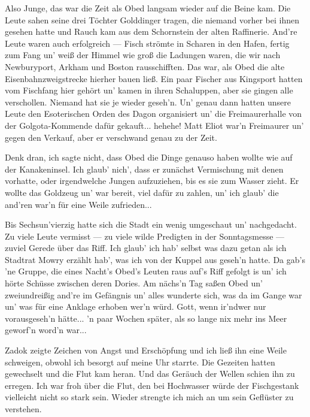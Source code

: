 Also Junge, das war die Zeit als Obed langsam wieder auf die Beine kam. Die Leute sahen seine drei Töchter Golddinger tragen, die niemand vorher bei ihnen gesehen hatte und Rauch kam aus dem Schornstein der alten Raffinerie. And're Leute waren auch erfolgreich --- Fisch strömte in Scharen in den Hafen, fertig zum Fang un' weiß der Himmel wie groß die Ladungen waren, die wir nach Newburyport, Arkham und Boston rausschifften. Das war, als Obed die alte Eisenbahnzweigstrecke hierher bauen ließ. Ein paar Fischer aus Kingsport hatten vom Fischfang hier gehört un' kamen in ihren Schaluppen, aber sie gingen alle verschollen. Niemand hat sie je wieder geseh'n. Un' genau dann hatten unsere Leute den Esoterischen Orden des Dagon organisiert un' die Freimaurerhalle von der Golgota-Kommende dafür gekauft... hehehe! Matt Eliot war'n Freimaurer un' gegen den Verkauf, aber er verschwand genau zu der Zeit.

Denk dran, ich sagte nicht, dass Obed die Dinge genauso haben wollte wie auf der Kanakeninsel. Ich glaub' nich', dass er zunächst Vermischung mit denen vorhatte, oder irgendwelche Jungen aufzuziehen, bis es sie zum Wasser zieht. Er wollte das Goldzeug un' war bereit, viel dafür zu zahlen, un' ich glaub' die and'ren war'n für eine Weile zufrieden...

Bis Sechsun'vierzig hatte sich die Stadt ein wenig umgeschaut un' nachgedacht. Zu viele Leute vermisst --- zu viele wilde Predigten in der Sonntagsmesse --- zuviel Gerede über das Riff. Ich glaub' ich hab' selbst was dazu getan als ich Stadtrat Mowry erzählt hab', was ich von der Kuppel aus geseh'n hatte. Da gab's 'ne Gruppe, die eines Nacht's Obed's Leuten raus auf's Riff gefolgt is un' ich hörte Schüsse zwischen deren Dories. Am nächs'n Tag saßen Obed un' zweiundreißig and're im Gefängnis un' alles wunderte sich, was da im Gange war un' was für eine Anklage erhoben wer'n würd. Gott, wenn ir'ndwer nur vorausgeseh'n hätte... 'n paar Wochen später, als so lange nix mehr ins Meer geworf'n word'n war...\grqq

Zadok zeigte Zeichen von Angst und Erschöpfung und ich ließ ihn eine Weile schweigen, obwohl ich besorgt auf meine Uhr starrte. Die Gezeiten hatten gewechselt und die Flut kam heran. Und das Geräuch der Wellen schien ihn zu erregen. Ich war froh über die Flut, den bei Hochwasser würde der Fischgestank vielleicht nicht so stark sein. Wieder strengte ich mich an um sein Geflüster zu verstehen.

